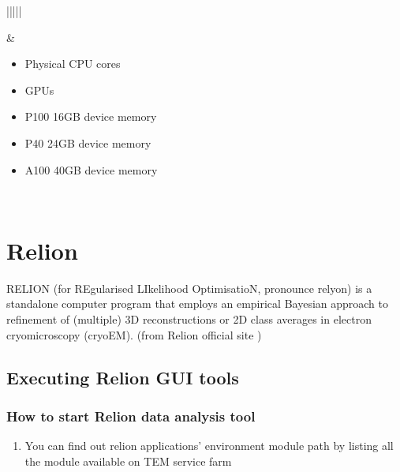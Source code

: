 \documentclass[a4paper,11pt,english]{sphinxmanual}
\begin{document}
\begin{savenotes}
\begin{tabulary}{\linewidth}[t]{|||||}
\begin{itemize}
\end{itemize}
&\begin{itemize}
\item {} 
 Physical CPU cores

\item {} 
 GPUs

\item {} 
\sphinxAtStartPar
P100 16GB device memory

\item {} 
\sphinxAtStartPar
P40 24GB device memory

\item {} 
\sphinxAtStartPar
A100 40GB device memory

\end{itemize}
\\
\sphinxbottomrule
\end{tabulary}
\sphinxtableafterendhook\par
\sphinxattableend\end{savenotes}

\sphinxstepscope


\chapter{Relion}
\label{\detokenize{relion:relion}}\label{\detokenize{relion::doc}}
\sphinxAtStartPar
RELION (for REgularised LIkelihood OptimisatioN, pronounce rely\sphinxhyphen{}on) is a stand\sphinxhyphen{}alone computer program that employs an empirical Bayesian approach to refinement of (multiple) 3D reconstructions or 2D class averages in electron cryo\sphinxhyphen{}microscopy (cryo\sphinxhyphen{}EM). (from Relion official site )


\section{Executing Relion GUI tools}
\label{\detokenize{relion:executing-relion-gui-tools}}

\subsection{How to start Relion data analysis tool}
\label{\detokenize{relion:how-to-start-relion-data-analysis-tool}}\begin{enumerate}
%
\item {} 
\sphinxAtStartPar
You can find out relion applications’ environment module path by listing all the module available on TEM service farm

\end{enumerate}
\end{document}
